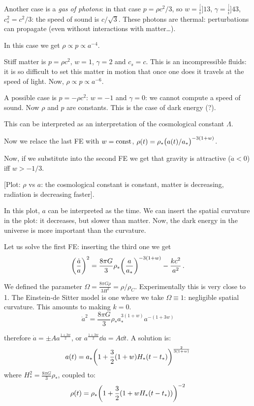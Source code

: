 \documentclass[main.tex]{subfiles}
\begin{document}
Another case is a \emph{gas of photons}: in that case \(p = \rho c^2 / 3\), so \(w=\frac[i]{1}{3} \), \(\gamma = \frac[i]{4}{3} \), \(c_{s}^2 = c^2 / 3 \): the speed of sound is \(c / \sqrt{3} \). These photons are thermal: perturbations can propagate (even without interactions with matter\dots). 

In this case we get \(\rho \propto p \propto a^{-4}\).

Stiff matter is \(p = \rho c^2\), \(w=1\), \(\gamma=2\) and \(c_s = c\). This is an incompressible fluids: it is so difficult to set this matter in motion that once one does it travels at the speed of light. Now, \(\rho \propto p \propto a^{-6}\).

A possible case is \(p = - \rho c^2\): \(w = -1\) and \(\gamma = 0\): we cannot compute a speed of sound. Now \(\rho\) and \(p\) are constants. This is the case of dark energy (?).

This can be interpreted as an interpretation of the cosmological constant \(\Lambda\).

Now we relace the last FE with \(w = \text{const}\), \(\rho(t) = \rho_{*} \qty(a(t) / a_{*})^{-3(1+w)}  \).

Now, if we substitute into the second FE we get that gravity is attractive (\(\ddot{a} < 0 \)) iff \(w > -1/3\). 

[Plot: \(\rho\) vs \(a\): the cosmological constant is constant, matter is decreasing, radiation is decreasing faster].

In this plot, \(a\) can be interpreted as the time.
We can insert the spatial curvature in the plot: it decreases, but slower than matter. 
Now, the dark energy in the universe is more important than the curvature. 

Let us solve the first FE: inserting the third one we get
\begin{equation}
  \qty(\frac{\dot{a} }{a})^2 = 
  \frac{8 \pi G}{3} \rho_* \qty(\frac{a}{a_*}) ^{-3 (1+w)} - \frac{kc^2}{a^2}\,.
\end{equation}

We defined the parameter \(\Omega = \frac{8 \pi G \rho}{3 H^2} = \rho / \rho_C\).
Experimentally this is very close to 1.
The Einstein-de Sitter model is one where we take \(\Omega \equiv 1\): negligible spatial curvature. This amounts to making \(k=0\).
\begin{equation}
  \dot{a}^2 = \frac{8 \pi G}{3} \rho_* a_{*}^{3 (1+w)} a^{-(1+3w)}
\end{equation}

therefore \(\dot{a} = \pm A a^{\frac{1+3w}{2}}\), or \(a ^{\frac{1+3w}{2}}\dd{a} = A \dd{t}\). A solution is:
\begin{equation}
  a(t)= a_{*} \qty(
    1 + \frac{3}{2} (1+w) H_{*} (t - t_{*})
  )^{\frac{2}{3(1+w)}}
\end{equation}
where \(H_{*}^2 = \frac{8 \pi G}{3} \rho_{*}\), coupled to:
\begin{equation}
  \rho(t) = \rho_{*} \qty(1 + \frac{3}{2}(1+w H_* (t-t_*)))^{-2}
\end{equation}
\end{document}
